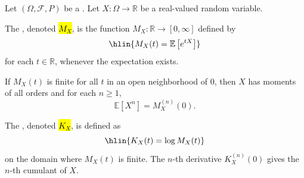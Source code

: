 \begin{definition} \label{definition:moment_generating_function_of_a_random_variable}
Let $(\Omega, \mathcal{F}, P)$ be a . Let $X: \Omega \to \mathbb{R}$ be a real-valued random variable.

The , denoted \hl{$M_X$}, is the function $M_X: \mathbb{R} \to [0, \infty]$ defined by
$$\hlin{M_X(t) = \mathbb{E}\left[e^{tX}\right]}$$
for each $t \in \mathbb{R}$, whenever the expectation exists.

If $M_X(t)$ is finite for all $t$ in an open neighborhood of $0$, then $X$ has moments of all orders and for each $n \geq 1$,
$$\mathbb{E}[X^n] = M_X^{(n)}(0).$$

The , denoted \hl{$K_X$}, is defined as
$$\hlin{K_X(t) = \log M_X(t)}$$
on the domain where $M_X(t)$ is finite. The $n$-th derivative $K_X^{(n)}(0)$ gives the $n$-th cumulant of $X$.
\end{definition}
